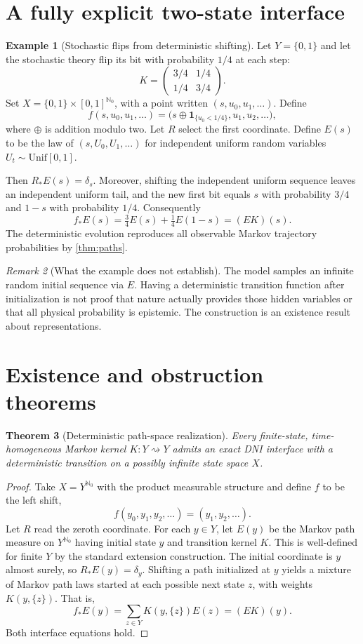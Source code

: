 \documentclass[11pt,letterpaper]{article}
\newtheorem{theorem}{Theorem}[section]
\theoremstyle{definition}
\newtheorem{example}[theorem]{Example}
\theoremstyle{remark}
\newtheorem{remark}[theorem]{Remark}
\newcommand{\one}{\mathbf 1}
\newcommand{\NN}{\mathbb N}
\begin{document}
\section{A fully explicit two-state interface}
\begin{example}[Stochastic flips from deterministic shifting]\label{ex:flip}
Let $Y=\{0,1\}$ and let the stochastic theory flip its bit with probability $1/4$ at each step:
\[
K=\begin{pmatrix}3/4&1/4\\[2pt]1/4&3/4\end{pmatrix}.
\]
Set $X=\{0,1\}\times[0,1]^{\NN_0}$, with a point written $(s,u_0,u_1,\ldots)$. Define
\[
f(s,u_0,u_1,\ldots)=
\bigl(s\oplus\one_{\{u_0<1/4\}},u_1,u_2,\ldots\bigr),
\]
where $\oplus$ is addition modulo two. Let $R$ select the first coordinate. Define $E(s)$ to be the law of $(s,U_0,U_1,\ldots)$ for independent uniform random variables $U_t\sim\mathrm{Unif}[0,1]$.

Then $R_*E(s)=\delta_s$. Moreover, shifting the independent uniform sequence leaves an independent uniform tail, and the new first bit equals $s$ with probability $3/4$ and $1-s$ with probability $1/4$. Consequently
\[
f_*E(s)=\tfrac34E(s)+\tfrac14E(1-s)=(EK)(s).
\]
The deterministic evolution reproduces all observable Markov trajectory probabilities by \cref{thm:paths}.
\end{example}

\begin{remark}[What the example does not establish]
The model samples an infinite random initial sequence via $E$. Having a deterministic transition function after initialization is not proof that nature actually provides those hidden variables or that all physical probability is epistemic. The construction is an existence result about representations.
\end{remark}

\section{Existence and obstruction theorems}
\begin{theorem}[Deterministic path-space realization]\label{thm:realize}
Every finite-state, time-homogeneous Markov kernel $K:Y\rightsquigarrow Y$ admits an exact DNI interface with a deterministic transition on a possibly infinite state space $X$.
\end{theorem}
\begin{proof}
Take $X=Y^{\NN_0}$ with the product measurable structure and define $f$ to be the left shift,
\[
f(y_0,y_1,y_2,\ldots)=(y_1,y_2,\ldots).
\]
Let $R$ read the zeroth coordinate. For each $y\in Y$, let $E(y)$ be the Markov path measure on $Y^{\NN_0}$ having initial state $y$ and transition kernel $K$. This is well-defined for finite $Y$ by the standard extension construction. The initial coordinate is $y$ almost surely, so $R_*E(y)=\delta_y$. Shifting a path initialized at $y$ yields a mixture of Markov path laws started at each possible next state $z$, with weights $K(y,\{z\})$. That is,
\[
f_*E(y)=\sum_{z\in Y}K(y,\{z\})E(z)=(EK)(y).
\]
Both interface equations hold.
\end{proof}
\end{document}

